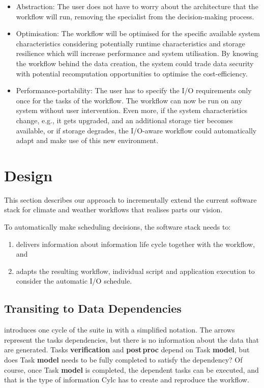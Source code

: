 \documentclass[a4paper]{article}
\begin{document}
\begin{itemize}
\item Abstraction: The user does not have to worry about the architecture that the workflow will run, removing the specialist from the decision-making process.

\item Optimisation: The workflow will be optimised for the specific available system characteristics considering potentially runtime characteristics and storage resilience which will increase performance and system utilisation.
By knowing the workflow behind the data creation, the system could trade data security with potential recomputation opportunities to optimise the cost-efficiency.

\item Performance-portability: The user has to specify the I/O requirements only once for the tasks of the workflow.
The workflow can now be run on any system without user intervention.
Even more, if the system characteristics change, e.g., it gets upgraded, and an additional storage tier becomes available, or if storage degrades, the I/O-aware workflow could automatically adapt and make use of this new environment.

\end{itemize}


\section{Design}

This section describes our approach to incrementally extend the current software stack for climate and weather workflows that realises parts our vision.

To automatically make scheduling decisions, the software stack needs to:
\begin{enumerate}
\item delivers information about information life cycle together with the workflow, and
\item adapts the resulting workflow, individual script and application execution to consider the automatic I/O schedule.
\end{enumerate}

\subsection{Transiting to Data Dependencies}

 introduces one cycle of the suite in  with a simplified notation. The arrows represent the tasks dependencies, but there is no information about the data that are generated. Tasks \textbf{verification} and \textbf{post\,proc} depend on Task \textbf{model}, but does Task \textbf{model} needs to be fully completed to satisfy the dependency?
Of course, once Task \textbf{model} is completed, the dependent tasks can be executed, and that is the type of information Cylc has to create and reproduce the workflow.
\end{document}
